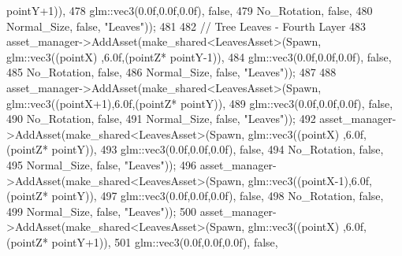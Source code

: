 \begin{DoxyCode}
      pointY+1)),
478                                                              glm::vec3(0.0f,0.0f,0.0f), \textcolor{keyword}{false},
479                                                              No\_Rotation, \textcolor{keyword}{false},
480                                                              Normal\_Size, \textcolor{keyword}{false}, \textcolor{stringliteral}{"Leaves"}));
481 
482             \textcolor{comment}{// Tree Leaves - Fourth Layer}
483             asset\_manager->AddAsset(make\_shared<LeavesAsset>(Spawn, glm::vec3((pointX)  ,6.0f,(pointZ*
      pointY-1)),
484                                                              glm::vec3(0.0f,0.0f,0.0f), \textcolor{keyword}{false},
485                                                              No\_Rotation, \textcolor{keyword}{false},
486                                                              Normal\_Size, \textcolor{keyword}{false}, \textcolor{stringliteral}{"Leaves"}));
487 
488             asset\_manager->AddAsset(make\_shared<LeavesAsset>(Spawn, glm::vec3((pointX+1),6.0f,(pointZ*
      pointY)),
489                                                              glm::vec3(0.0f,0.0f,0.0f), \textcolor{keyword}{false},
490                                                              No\_Rotation, \textcolor{keyword}{false},
491                                                              Normal\_Size, \textcolor{keyword}{false}, \textcolor{stringliteral}{"Leaves"}));
492             asset\_manager->AddAsset(make\_shared<LeavesAsset>(Spawn, glm::vec3((pointX)  ,6.0f,(pointZ*
      pointY)),
493                                                              glm::vec3(0.0f,0.0f,0.0f), \textcolor{keyword}{false},
494                                                              No\_Rotation, \textcolor{keyword}{false},
495                                                              Normal\_Size, \textcolor{keyword}{false}, \textcolor{stringliteral}{"Leaves"}));
496             asset\_manager->AddAsset(make\_shared<LeavesAsset>(Spawn, glm::vec3((pointX-1),6.0f,(pointZ*
      pointY)),
497                                                              glm::vec3(0.0f,0.0f,0.0f), \textcolor{keyword}{false},
498                                                              No\_Rotation, \textcolor{keyword}{false},
499                                                              Normal\_Size, \textcolor{keyword}{false}, \textcolor{stringliteral}{"Leaves"}));
500             asset\_manager->AddAsset(make\_shared<LeavesAsset>(Spawn, glm::vec3((pointX)  ,6.0f,(pointZ*
      pointY+1)),
501                                                              glm::vec3(0.0f,0.0f,0.0f), \textcolor{keyword}{false},

\end{DoxyCode}
